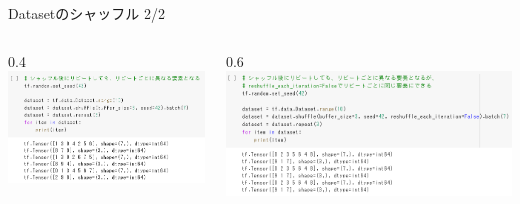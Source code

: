 \documentclass[aspectratio=169, dvipdfmx, 14pt, xcolor={svgnames,dvipsnames}, t]{beamer}
\newlength{\mytotalwidth}
\newlength{\mycolumnwidth}
\begin{document}
\begin{frame}{Datasetのシャッフル 2/2}

  \begin{columns}[totalwidth=\mytotalwidth]
    \begin{column}[T]{0.4\mycolumnwidth}
      \centering
      \includegraphics[width=160pt]{img/hands-on-ml_13-1-2_1.png}
    \end{column}

    \begin{column}[T]{0.6\mycolumnwidth}
      \centering
      \includegraphics[width=240pt]{img/hands-on-ml_13-1-2_2.png}
    \end{column}
  \end{columns}


\end{frame}

\end{document}
